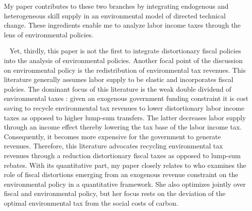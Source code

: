 My paper contributes to these two branches by integrating endogenous and heterogeneous skill supply in an environmental model of directed technical change. These ingredients enable me to analyze labor income taxes through the lens of environmental policies.  




\
Yet, thirdly, this paper is not the first to integrate distortionary fiscal policies into the analysis of environmental policies.
Another focal point of the discussion on environmental policy is the redistribution of environmental tax revenues. This literature generally assumes labor supply to be elastic and incorporates fiscal polcies. 
The dominant focus of this literature is the weak double dividend of environmental taxes \citep{Goulder1995EnvironmentalGuide, Bovenberg2002EnvironmentalRegulation}: given an exogenous government funding constraint it is cost saving to recycle environmental tax revenues to lower distortionary labor income taxes as opposed to higher lump-sum transfers. The latter decreases labor supply through an income effect thereby lowering the tax base of the labor income tax. Consequently, it becomes more expensive for the government to generate revenues.
Therefore, this literature advocates recycling environmental tax revenues through a reduction distortionary fiscal taxes as opposed to lump-sum rebates.
With its quantitative part, my paper closely relates to \cite{Barrage2019OptimalPolicy} who examines the role of fiscal distortions emerging from an exogenous revenue constraint on the environmental policy in a quantitative framework. She also optimizes jointly over fiscal and environmental policy, but her focus rests on the deviation of the optimal environmental tax from the social costs of carbon.

